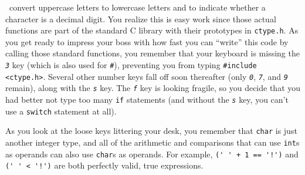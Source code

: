 \transitionone\ convert uppercase letters to lowercase letters and to indicate whether a character is a decimal digit.
You realize this is easy work since those actual functions are part of the standard C library with their prototypes in \texttt{ctype.h}.
As you get ready to impress your boss with how fast you can ``write'' this code by calling those standard functions, you remember that your keyboard is missing the \textit{\texttt{3}} key (which is also used for \textit{\texttt{\#}}), preventing you from typing \lstinline{#include <ctype.h>}.
Several other number keys fall off soon thereafter (only \textit{\texttt{0}}, \textit{\texttt{7}}, and \textit{\texttt{9}} remain), along with the \textit{\texttt{s}} key.
The \textit{\texttt{f}} key is looking fragile, so you decide that you had better not type too many \lstinline{if} statements (and without the \textit{\texttt{s}} key, you can't use a \lstinline{switch} statement at all).

As you look at the loose keys littering your desk, you remember that \lstinline{char} is just another integer type,
and all of the arithmetic and comparisons that can use \lstinline{int}s as operands can also use \lstinline{char}s as operands.
For example, \lstinline{(' ' + 1 == '!')} and \lstinline{(' ' < '!')} are both perfectly valid, true expressions.

\begin{description}
\end{description}

